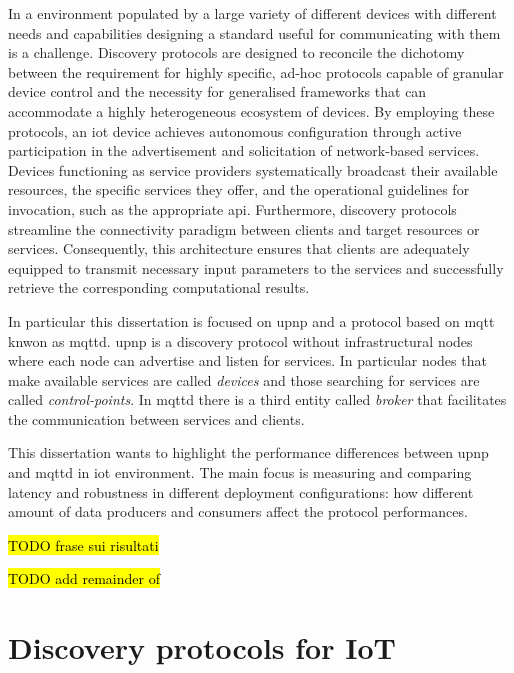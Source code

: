 \documentclass[lettersize,journal]{IEEEtran}
\begin{document}
In a environment populated by a large variety of different devices with different needs and capabilities designing a standard useful for communicating with them is a challenge.
Discovery protocols are designed to reconcile the dichotomy between the requirement for highly specific, ad-hoc protocols capable of granular device control and the necessity for generalised frameworks that can accommodate a highly heterogeneous ecosystem of devices.
By employing these protocols, an \gls{iot} device achieves autonomous configuration through active participation in the advertisement and solicitation of network-based services.
Devices functioning as service providers systematically broadcast their available resources, the specific services they offer, and the operational guidelines for invocation, such as the appropriate \gls{api}. Furthermore, discovery protocols streamline the connectivity paradigm between clients and target resources or services. 
Consequently, this architecture ensures that clients are adequately equipped to transmit necessary input parameters to the services and successfully retrieve the corresponding computational results.

In particular this dissertation is focused on \gls{upnp} and a protocol based on \gls{mqtt} knwon as \gls{mqttd}. \gls{upnp} is a discovery protocol without infrastructural nodes where each node can advertise and listen for services. In particular nodes that make available services are called \textit{devices} and those searching for services are called \textit{control-points}.
In \gls{mqttd} there is a third entity called \textit{broker} that facilitates the communication between services and clients.

This dissertation wants to highlight the performance differences between \gls{upnp} and \gls{mqttd} in \gls{iot} environment. The main focus is measuring and comparing latency and robustness in different deployment configurations: how different amount of data producers and consumers affect the protocol performances.

\textcolor{blue}{\hl{TODO frase sui risultati}}

\textcolor{blue}{\hl{TODO add remainder of}}

\section{Discovery protocols for IoT}
\end{document}
